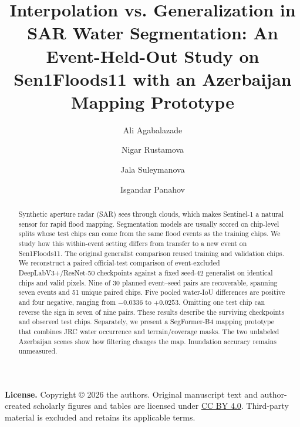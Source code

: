 \documentclass[runningheads,orivec]{llncs}
\begin{document}
\title{Interpolation vs. Generalization in SAR Water Segmentation: An Event-Held-Out Study on Sen1Floods11 with an Azerbaijan Mapping Prototype}
\author{Ali Agabalazade \and Nigar Rustamova \and
Jala Suleymanova \and Isgandar Panahov}
\maketitle

\begin{abstract}
Synthetic aperture radar (SAR) sees through clouds, which makes Sentinel-1
a natural sensor for rapid flood mapping. Segmentation models are usually
scored on chip-level splits whose test chips can come from the same flood
events as the training chips. We study how this within-event setting
differs from transfer to a new event on Sen1Floods11. The original
generalist comparison reused training and validation chips. We reconstruct a
paired official-test comparison of event-excluded DeepLabV3+/ResNet-50
checkpoints against a fixed seed-42 generalist on identical chips and valid
pixels. Nine of 30 planned event--seed pairs are recoverable, spanning
seven events and 51 unique paired chips. Five pooled water-IoU differences are
positive and four negative, ranging from $-0.0336$ to $+0.0253$. Omitting
one test chip can reverse the sign in seven of nine pairs. These results
describe the surviving checkpoints and observed test chips. Separately, we
present a SegFormer-B4 mapping prototype that combines JRC water occurrence
and terrain/coverage masks. The two unlabeled Azerbaijan scenes show
how filtering changes the map. Inundation accuracy remains unmeasured.
\end{abstract}








\par\medskip
\noindent\textbf{License.} Copyright \copyright{} 2026 the authors.
Original manuscript text and author-created scholarly figures and tables are
licensed under \href{https://creativecommons.org/licenses/by/4.0/}{CC BY 4.0}.
Third-party material is excluded and retains its applicable terms.



\end{document}
